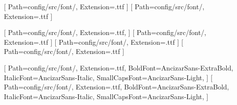 

\newfontfamily{}[
    Path=config/src/font/,
    Extension=.ttf
]
\newfontfamily{}[
    Path=config/src/font/,
    Extension=.ttf
]

\newfontfamily{}[
    Path=config/src/font/,
    Extension=.ttf,
]
\newfontfamily{}[
    Path=config/src/font/,
    Extension=.ttf
]
\newfontfamily{}[
    Path=config/src/font/,
    Extension=.ttf
]
\newfontfamily{}[
    Path=config/src/font/,
    Extension=.ttf
]

\setmainfont{AncizarSans-Regular}[
    Path=config/src/font/,
    Extension=.ttf,
    BoldFont=AncizarSans-ExtraBold,
    ItalicFont=AncizarSans-Italic,
    SmallCapsFont=AncizarSans-Light,
]
\setsansfont{AncizarSans-Regular}[
    Path=config/src/font/,
    Extension=.ttf,
    BoldFont=AncizarSans-ExtraBold,
    ItalicFont=AncizarSans-Italic,
    SmallCapsFont=AncizarSans-Light,
]
